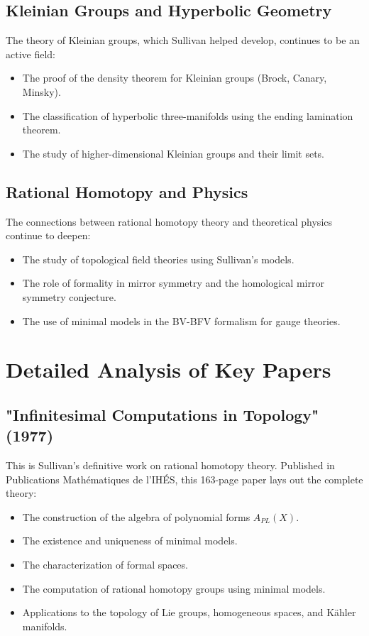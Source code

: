 \subsection{Kleinian Groups and Hyperbolic Geometry}

The theory of Kleinian groups, which Sullivan helped develop, continues to be an active field:
\begin{itemize}
\item The proof of the density theorem for Kleinian groups (Brock, Canary, Minsky).
\item The classification of hyperbolic three-manifolds using the ending lamination theorem.
\item The study of higher-dimensional Kleinian groups and their limit sets.
\end{itemize}

\subsection{Rational Homotopy and Physics}

The connections between rational homotopy theory and theoretical physics continue to deepen:
\begin{itemize}
\item The study of topological field theories using Sullivan's models.
\item The role of formality in mirror symmetry and the homological mirror symmetry conjecture.
\item The use of minimal models in the BV-BFV formalism for gauge theories.
\end{itemize}

\section{Detailed Analysis of Key Papers}

\subsection{"Infinitesimal Computations in Topology" (1977)}

This is Sullivan's definitive work on rational homotopy theory. Published in Publications Math\'ematiques de l'IH\'ES, this 163-page paper lays out the complete theory:
\begin{itemize}
\item The construction of the algebra of polynomial forms $A_{PL}(X)$.
\item The existence and uniqueness of minimal models.
\item The characterization of formal spaces.
\item The computation of rational homotopy groups using minimal models.
\item Applications to the topology of Lie groups, homogeneous spaces, and K\"ahler manifolds.
\end{itemize}

